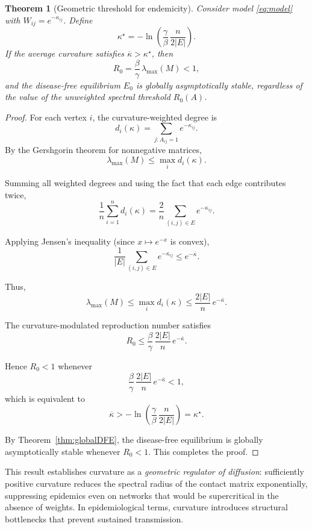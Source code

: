 \documentclass[final,3p,times,twocolumn]{elsarticle}
\newtheorem{theorem}{Theorem}
\begin{document}
\begin{theorem}[Geometric threshold for endemicity]
\label{thm:geomthreshold}
Consider model \eqref{eq:model} with $W_{ij}=e^{-\kappa_{ij}}$.  
Define
\[
    \kappa^\star
    =
    -\ln\!\left(
        \frac{\gamma}{\beta}\,
        \frac{n}{2|E|}
    \right).
\]
If the average curvature satisfies $\overline{\kappa} > \kappa^\star$, then
\[
    R_0
    =
    \frac{\beta}{\gamma}\,\lambda_{\max}(M)
    < 1,
\]
and the disease-free equilibrium $E_0$ is globally asymptotically stable,
regardless of the value of the unweighted spectral threshold $R_0(A)$.
\end{theorem}

\begin{proof}
For each vertex $i$, the curvature-weighted degree is
\[
    d_i(\kappa)
    =
    \sum_{j : A_{ij}=1} e^{-\kappa_{ij}}.
\]
By the Gershgorin theorem for nonnegative matrices,
\[
    \lambda_{\max}(M) \le \max_i d_i(\kappa).
\]

Summing all weighted degrees and using the fact that each edge contributes twice,
\[
    \frac{1}{n}\sum_{i=1}^n d_i(\kappa)
    =
    \frac{2}{n}
    \sum_{(i,j)\in E} e^{-\kappa_{ij}}.
\]

Applying Jensen's inequality (since $x\mapsto e^{-x}$ is convex),
\[
    \frac{1}{|E|}
    \sum_{(i,j)\in E} e^{-\kappa_{ij}}
    \le
    e^{-\overline{\kappa}}.
\]

Thus,
\[
    \lambda_{\max}(M)
    \le
    \max_i d_i(\kappa)
    \le
    \frac{2|E|}{n}\,e^{-\overline{\kappa}}.
\]

The curvature-modulated reproduction number satisfies
\[
    R_0
    \le
    \frac{\beta}{\gamma}\,
    \frac{2|E|}{n}\,
    e^{-\overline{\kappa}}.
\]

Hence $R_0<1$ whenever
\[
    \frac{\beta}{\gamma}\,
    \frac{2|E|}{n}\,
    e^{-\overline{\kappa}}
    < 1,
\]
which is equivalent to
\[
    \overline{\kappa} > -\ln\!\left(
        \frac{\gamma}{\beta}\,
        \frac{n}{2|E|}
    \right)
    = \kappa^\star.
\]

By Theorem~\ref{thm:globalDFE}, the disease-free equilibrium is globally
asymptotically stable whenever $R_0<1$.  
This completes the proof.
\end{proof}

This result establishes curvature as a \emph{geometric regulator of diffusion}:
sufficiently positive curvature reduces the spectral radius of the contact
matrix exponentially, suppressing epidemics even on networks that would be
supercritical in the absence of weights.  
In epidemiological terms, curvature introduces structural bottlenecks that
prevent sustained transmission.
\end{document}
